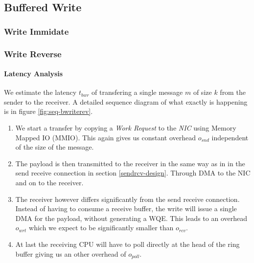 
\subsection{Buffered Write}

\subsubsection{Write Immidate}


\subsubsection{Write Reverse}

\paragraph{Latency Analysis}

We estimate the latency $t_{bwr}$ of transfering a single message $m$ of size $k$ from the sender to the receiver. 
A detailed sequence diagram of what exactly is happening is in figure \ref{fig:seq-bwriterev}. 

\begin{enumerate}
  \item We start a transfer by copying a \emph{Work Request} to the \emph{NIC} using Memory Mapped IO (MMIO). This again gives
    us constant overhead $o_{snd}$ independent of the size of the message.
  \item The payload is then transmitted to the receiver in the same way as in in the send receive connection in section 
    \ref{sendrcv-design}. Through DMA to the NIC and on to the receiver.
  \item The receiver however differs significantly from the send receive connection. Instead of having to consume a receive buffer,
    the write will issue a single DMA for the payload, without generating a WQE. This leads to an overhead $o_{wrt}$ which we
    expect to be significantly smaller than $o_{rcv}$.
  \item At last the receiving CPU will have to poll directly at the head of the ring buffer giving us an other overhead of $o_{poll}$.
\end{enumerate}



